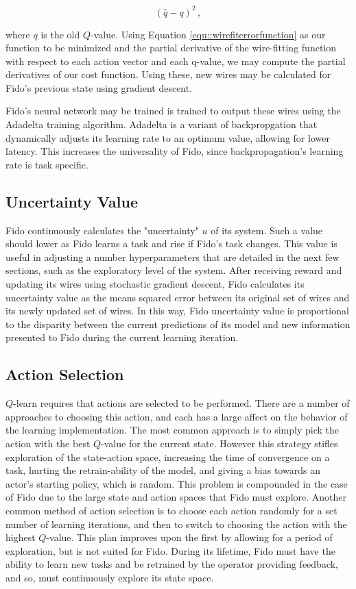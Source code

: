 \begin{equation}
	(\hat{q} - q)^2
	\,,
	\label{equ::wirefiterrorfunction}
\end{equation}

\noindent

where $q$ is the old $Q$-value.
Using Equation \ref{equ::wirefiterrorfunction} as our function to be minimized and the partial derivative of the wire-fitting function with respect to each action vector and each q-value, we may compute the partial derivatives of our cost function.
Using these, new wires may be calculated for Fido's previous state using gradient descent.

Fido's neural network may be trained is trained to output these wires using the Adadelta training algorithm. Adadelta is a variant of backpropgation that dynamically adjusts its learning rate to an optimum value, allowing for lower latency. This increases the universality of Fido, since backpropagation's learning rate is task specific.

\subsection{Uncertainty Value}

Fido continuously calculates the "uncertainty" $u$ of its system. Such a value should lower as Fido learns a task and rise if Fido's task changes. This value is useful in adjusting a number hyperparameters that are detailed in the next few sections, such as the exploratory level of the system. After receiving reward and updating its wires using stochastic gradient descent, Fido calculates its uncertainty value as the means squared error between its original set of wires and its newly updated set of wires. In this way, Fido uncertainty value is proportional to the disparity between the current predictions of its model and new information presented to Fido during the current learning iteration.

\subsection{Action Selection}

$Q$-learn requires that actions are selected to be performed.
There are a number of approaches to choosing this action, and each has a large affect on the behavior of the learning implementation.
The most common approach is to simply pick the action with the best $Q$-value for the current state.
However this strategy stifles exploration of the state-action space, increasing the time of convergence on a task, hurting the retrain-ability of the model, and giving a bias towards an actor's starting policy, which is random.
This problem is compounded in the case of Fido due to the large state and action spaces that Fido must explore.
Another common method of action selection is to choose each action randomly for a set number of learning iterations, and then to switch to choosing the action with the highest $Q$-value.
This plan improves upon the first by allowing for a period of exploration, but is not suited for Fido.
During its lifetime, Fido must have the ability to learn new tasks and be retrained by the operator providing feedback, and so, must continuously explore its state space.


